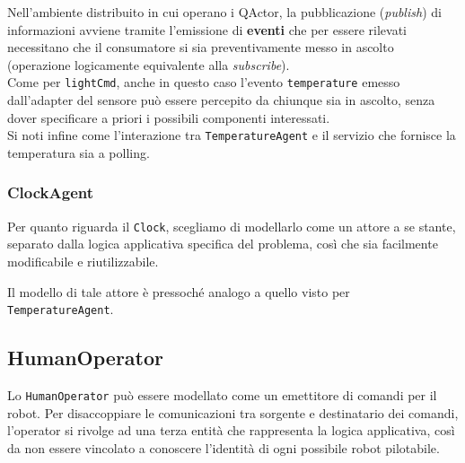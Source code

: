 \documentclass{../llncs}
\newcommand{\codescript}[1]{{\mbox{\small{\texttt{#1}}}}\xspace}
\newcommand{\labelssec}[1]{\label{ssec:#1}}
\begin{document}
Nell'ambiente distribuito in cui operano i QActor, la pubblicazione (\textit{publish}) di informazioni avviene tramite l'emissione di \textbf{eventi} che per essere rilevati necessitano che il consumatore si sia preventivamente messo in ascolto (operazione logicamente equivalente alla \textit{subscribe}).\\



Come per \codescript{lightCmd}, anche in questo caso l'evento \codescript{temperature}%
emesso dall'adapter del sensore può essere percepito da chiunque sia in ascolto, senza dover specificare a priori i possibili componenti interessati.\\

Si noti infine come l'interazione tra \codescript{TemperatureAgent} e il servizio che fornisce la temperatura sia a polling.

\subsubsection{ClockAgent}
Per quanto riguarda il \texttt{Clock}, scegliamo di modellarlo come un attore a se stante, separato dalla logica applicativa specifica del problema, così che sia facilmente modificabile e riutilizzabile.%

Il modello di tale attore è pressoché analogo a quello visto per \texttt{TemperatureAgent}.\\



\subsection{HumanOperator}
\labelssec{humanOpRA}
Lo \texttt{HumanOperator} può essere modellato come un emettitore di comandi per il robot. Per disaccoppiare le comunicazioni tra sorgente e destinatario dei comandi, l'operator si rivolge ad una terza entità che rappresenta la logica applicativa, così da non essere vincolato a conoscere l'identità di ogni possibile robot pilotabile.\\
\end{document}
